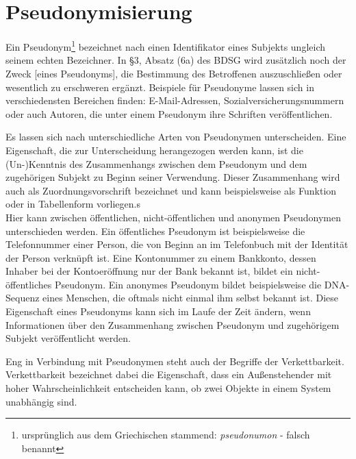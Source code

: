 \section{Pseudonymisierung}

\label{sec_basics_pseudonymity}

Ein Pseudonym\footnote{
	ursprünglich aus dem Griechischen stammend: \textit{pseudonumon} - falsch benannt
} bezeichnet nach \cite{pfitzmann2010} einen Identifikator eines Subjekts ungleich seinem echten Bezeichner. In §3, Absatz (6a) des BDSG wird zusätzlich noch der \glqq Zweck [eines Pseudonyms], die Bestimmung des Betroffenen auszuschließen oder wesentlich zu erschweren\grqq{}\cite{TODO} ergänzt. Beispiele für Pseudonyme lassen sich in verschiedensten Bereichen finden: E-Mail-Adressen, Sozialversicherungsnummern oder auch Autoren, die unter einem Pseudonym ihre Schriften veröffentlichen.

Es lassen sich nach \cite{pfitzmann1990} unterschiedliche Arten von Pseudonymen unterscheiden. Eine Eigenschaft, die zur Unterscheidung herangezogen werden kann, ist die (Un-)Kenntnis des Zusammenhangs zwischen dem Pseudonym und dem zugehörigen Subjekt zu Beginn seiner Verwendung. Dieser Zusammenhang wird auch als Zuordnungsvorschrift bezeichnet und kann beispielsweise als Funktion oder in Tabellenform vorliegen.s\\
Hier kann zwischen öffentlichen, nicht-öffentlichen und anonymen Pseudonymen unterschieden werden. Ein öffentliches Pseudonym ist beispielsweise die Telefonnummer einer Person, die von Beginn an im Telefonbuch mit der Identität der Person verknüpft ist. Eine Kontonummer zu einem Bankkonto, dessen Inhaber bei der Kontoeröffnung nur der Bank bekannt ist, bildet ein nicht-öffentliches Pseudonym. Ein anonymes Pseudonym bildet beispielsweise die DNA-Sequenz eines Menschen, die oftmals nicht einmal ihm selbst bekannt ist. Diese Eigenschaft eines Pseudonyms kann sich im Laufe der Zeit ändern, wenn Informationen über den Zusammenhang zwischen Pseudonym und zugehörigem Subjekt veröffentlicht werden.

Eng in Verbindung mit Pseudonymen steht auch der Begriffe der Verkettbarkeit. 
Verkettbarkeit bezeichnet dabei die Eigenschaft, dass ein Außenstehender mit hoher Wahrscheinlichkeit entscheiden kann, ob zwei Objekte in einem System unabhängig sind\cite{pfitzmann2010}.

